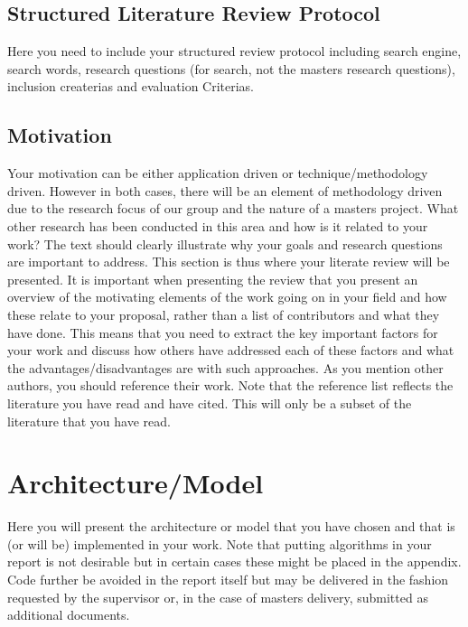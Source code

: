 \documentclass[a4paper]{book}
\begin{document}
\section{Structured Literature Review Protocol}

Here you need to include your structured review protocol including search engine, search words, research questions  (for search, not the masters research questions), inclusion createrias and evaluation Criterias. 

\section{Motivation}
\label{sec:no2}

Your motivation can be either application driven or technique/methodology driven. However in both cases, there will be an element of methodology driven due to the research focus of our group and the nature of a masters project.  
What other research has been conducted in this area and how is it related to your work? The text should clearly illustrate why your goals and research questions are important to address. This section is thus where your literate review will be presented. It is important when presenting the review that you present an overview of the motivating elements of the work going on in your field and how these relate to your proposal, rather than a list of contributors and what they have done. This means that you need to extract the key important factors for your work and discuss how others have addressed each of these factors and what the advantages/disadvantages are with such approaches. As you mention other authors, you should reference their work. Note that the reference list reflects the literature you have read and have cited. This will only be a subset of the literature that you have read.

\chapter{Architecture/Model}
\label{sec:architectureAndModel}

Here you will present the architecture or model that you have chosen and that is (or will be) implemented in your work. Note that putting algorithms in your report is not desirable but in certain cases these might be placed in the appendix. Code further be avoided in the report itself but may be delivered in the fashion requested by the supervisor or, in the case of masters delivery, submitted as additional documents. 
\end{document}
